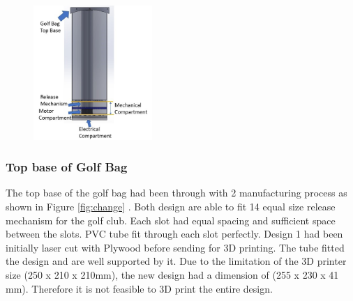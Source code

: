 \documentclass[11pt,landscape]{article}
\begin{document}
\begin{multicols}{3}
    
    \begin{figure}[H]
        \begin{center}
            \includegraphics[width=0.4\textwidth]{Figure16.jpg}
            \label{fig:golfbag}
        \end{center}
    \end{figure}
    
    
    
    \subsubsection{Top base of Golf Bag}
    The top base of the golf bag had been through with 2 manufacturing process
    as shown in Figure \ref{fig:change} . Both design are able to fit 14 equal
    size release mechanism for the golf club. Each slot had equal spacing and
    sufficient space between the slots. PVC tube fit through each slot
    perfectly. Design 1 had been initially laser cut with Plywood before sending
    for 3D printing. The tube fitted the design and are well supported by it.
    Due to the limitation of the 3D printer size (250 x 210 x 210mm), the new
    design had a dimension of (255 x 230 x 41 mm). Therefore it is not feasible
    to 3D print the entire design.
    

\end{multicols}
\end{document}
